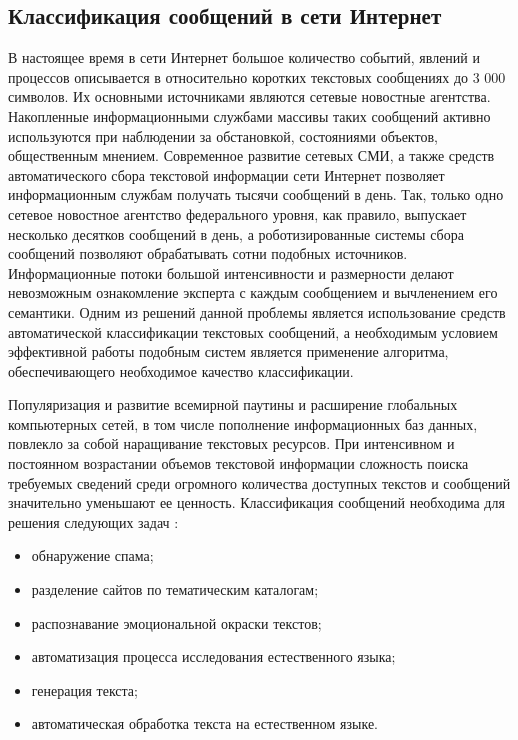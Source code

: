 \subsection{Классификация сообщений в сети Интернет}

В настоящее время в сети Интернет большое количество событий, явлений и процессов описывается в относительно коротких текстовых сообщениях до 3 000 символов.
Их основными источниками являются сетевые новостные агентства.
Накопленные информационными службами массивы таких сообщений активно используются при наблюдении за обстановкой, состояниями объектов, общественным мнением.
Современное развитие сетевых СМИ, а также средств автоматического сбора текстовой информации сети Интернет позволяет информационным службам получать тысячи сообщений в день.
Так, только одно сетевое новостное агентство федерального уровня, как правило, выпускает несколько десятков сообщений в день, а роботизированные системы сбора сообщений позволяют обрабатывать сотни подобных источников.
Информационные потоки большой интенсивности и размерности делают невозможным ознакомление эксперта с каждым сообщением и вычленением его семантики.
Одним из решений данной проблемы является использование средств автоматической классификации текстовых сообщений, а необходимым условием эффективной работы подобным систем является применение алгоритма, обеспечивающего необходимое качество классификации. \cite{messageClassification}

Популяризация и развитие всемирной паутины и расширение глобальных компьютерных сетей, в том числе пополнение информационных баз данных, повлекло за собой наращивание текстовых ресурсов.
При интенсивном и постоянном возрастании объемов текстовой информации сложность поиска требуемых сведений среди огромного количества доступных текстов и сообщений значительно уменьшают ее ценность.
Классификация сообщений необходима для решения следующих задач \cite{classificationPromlems}:
\begin{itemize}
	\item обнаружение спама;
	\item разделение сайтов по тематическим каталогам;
	\item распознавание эмоциональной окраски текстов;
	\item автоматизация процесса исследования естественного языка;
	\item генерация текста;
	\item автоматическая обработка текста на естественном языке.
\end{itemize}

